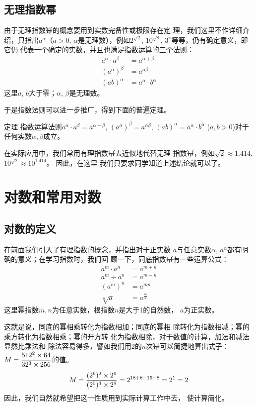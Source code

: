 \subsection{无理指数幂}
由于无理指数幂的概念要用到实数完备性或极限存在定
理，我们这里不作详细介绍，只指出$a^{\alpha}$（$a>0$, $\alpha$是无理数），例如$2^{\sqrt{2}}$, $10^{\sqrt{8}}$, $3^{\pi}$等等，仍有确定意义，即它仍
代表一个确定的实数，并且也满足指数运算的三个法则：
\[\begin{split}
    a^{\alpha}\cdot a^{\beta}&=a^{\alpha+\beta}\\
    \left(a^{\alpha}\right)^{\beta}&=a^{\alpha\beta}\\
    (ab)^{\alpha}&=a^{\alpha}\cdot b^{\alpha}
\end{split}\]
这里$a$, $b$大于零；$\alpha$, $\beta$是无理数。

于是指数法则可以进一步推广，得到下面的普遍定理。

\begin{blk}{定理}
    指数运算法则$a^{\alpha}\cdot a^{\beta}=a^{\alpha+\beta}$, $\left(a^{\alpha}\right)^{\beta}=a^{\alpha\beta}$, $(ab)^{\alpha}=a^{\alpha}\cdot b^{\alpha}$ ($a,b>0$)对于任何实数$\alpha, \beta$成立。
\end{blk}

在实际应用中，我们常用有理指数幂去近似地代替无理
指数幂，例如$\sqrt{2}\approx 1.414$, $10^{\sqrt{2}}\approx 10^{1.414}$。
因此，在这里
我们只要求同学知道上述结论就可以了。

\section{对数和常用对数}
\subsection{对数的定义}

在前面我们引入了有理指数的概念，并指出对于正实数
$a$与任意实数$\alpha$, $a^{\alpha}$都有明确的意义；在学习指数时，我们回
顾一下，同底指数幂有一些运算公式：
\[\begin{split}
    a^{m}\cdot a^n&=a^{m+n}\\
    a^{m}\div a^n&=a^{m-n}\\
    (a^m)^n&=a^{mn}\\
    \sqrt[n]{a}&=a^{\tfrac{m}{n}}
\end{split}\]
这里幂指数$m,n$为任意实数，根指数$n$是大于1的自然数，
$a$为正实数。

这就是说，同底的幂相乘转化为指数相加；同底的幂相
除转化为指数相减；幂的乘方转化为指数相乘；幂的开方转
化为指数相除，对于数值的计算，加法和减法显然比乘法和
除法容易得多，譬如我们用2的$n$次幂可以简捷地算出式子：
$M=\dfrac{512^2\times 64}{32^3\times 256}$的值。
\[M=\dfrac{(2^9)^2\times 2^6}{(2^5)^3\times 2^8}=2^{18+6-15-8}=2^1=2\]
因此，我们自然就希望把这一性质用到实际计算工作中去，
使计算简化。

